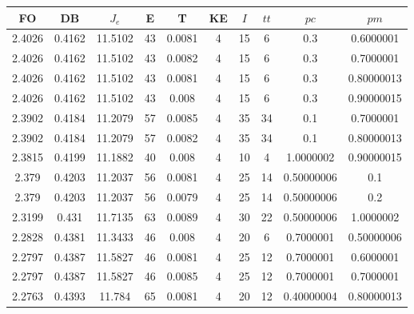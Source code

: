 \begin{table}[h!]
    \footnotesize
    \begin{center}
        \begin{tabular}{|c|c|c|c|c|c|c|c|c|c|}
        \hline
            {\bf FO} & {\bf DB} & $J_e$ & {\bf E} & {\bf T} & {\bf KE} & $I$ & $tt$ & $pc$ & $pm$ \\
        \hline
        \hline
            2.4026 & 0.4162  & 11.5102 & 43 & 0.0081 & 4 & 15 & 6 & 0.3 & 0.6000001\\
        \hline
        \hline
            2.4026 & 0.4162  & 11.5102 & 43 & 0.0082 & 4 & 15 & 6 & 0.3 & 0.7000001\\
        \hline
        \hline
            2.4026 & 0.4162  & 11.5102 & 43 & 0.0081 & 4 & 15 & 6 & 0.3 & 0.80000013\\
        \hline
        \hline
            2.4026 & 0.4162  & 11.5102 & 43 & 0.008 & 4 & 15 & 6 & 0.3 & 0.90000015\\
        \hline
        \hline
            2.3902 & 0.4184  & 11.2079 & 57 & 0.0085 & 4 & 35 & 34 & 0.1 & 0.7000001\\
        \hline
        \hline
            2.3902 & 0.4184  & 11.2079 & 57 & 0.0082 & 4 & 35 & 34 & 0.1 & 0.80000013\\
        \hline
        \hline
            2.3815 & 0.4199  & 11.1882 & 40 & 0.008 & 4 & 10 & 4 & 1.0000002 & 0.90000015\\
        \hline
        \hline
            2.379 & 0.4203  & 11.2037 & 56 & 0.0081 & 4 & 25 & 14 & 0.50000006 & 0.1\\
        \hline
        \hline
            2.379 & 0.4203  & 11.2037 & 56 & 0.0079 & 4 & 25 & 14 & 0.50000006 & 0.2\\
        \hline
        \hline
            2.3199 & 0.431  & 11.7135 & 63 & 0.0089 & 4 & 30 & 22 & 0.50000006 & 1.0000002\\
        \hline
        \hline
            2.2828 & 0.4381  & 11.3433 & 46 & 0.008 & 4 & 20 & 6 & 0.7000001 & 0.50000006\\
        \hline
        \hline
            2.2797 & 0.4387  & 11.5827 & 46 & 0.0081 & 4 & 25 & 12 & 0.7000001 & 0.6000001\\
        \hline
        \hline
            2.2797 & 0.4387  & 11.5827 & 46 & 0.0085 & 4 & 25 & 12 & 0.7000001 & 0.7000001\\
        \hline
        \hline
            2.2763 & 0.4393  & 11.784 & 65 & 0.0081 & 4 & 20 & 12 & 0.40000004 & 0.80000013\\

\end{tabular}
\end{center}
\end{table}

